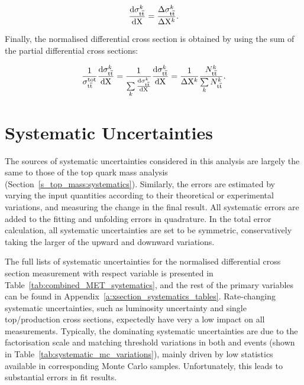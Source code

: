 \begin{equation}
\label{eq:differential_xsection}
\frac{\mathrm{d}\sigma_{\mathrm{t}\overline{\mathrm{t}}}^k}{\mathrm{d} \mathrm{X}} = \frac{\Delta\sigma_{\mathrm{t}\overline{\mathrm{t}}}^k}{\Delta \mathrm{X}^k }.
\end{equation}

Finally, the normalised differential cross section is obtained by using the sum of the partial differential cross
sections:

\begin{equation}
\label{eq:normalised_differential_xsection}
\frac{1}{\sigma_{\mathrm{t}\overline{\mathrm{t}}}^\mathrm{tot}} \frac{\mathrm{d}\sigma_{\mathrm{t}\overline{\mathrm{t}}}^k}{\mathrm{d} \mathrm{X}} =
\frac{1}{\sum\limits_k{\frac{\mathrm{d}\sigma_{\mathrm{t}\overline{\mathrm{t}}}^k}{\mathrm{d} \mathrm{X}}}} \frac{\mathrm{d}\sigma_{\mathrm{t}\overline{\mathrm{t}}}^k}{\mathrm{d}
\mathrm{X}} = \frac{1}{\Delta \mathrm{X}^k} \frac{N_{\mathrm{t}\overline{\mathrm{t}}}^k}{\sum\limits_k N_{\mathrm{t}\overline{\mathrm{t}}}^k}.
\end{equation}

\section{Systematic Uncertainties}
\label{s_xsection:systematics}
The sources of systematic uncertainties considered in this analysis are largely the same to those of the top quark mass
analysis (Section~\ref{s_top_mass:systematics}). Similarly, the errors are estimated by varying the input quantities
according to their theoretical or experimental variations, and measuring the change in the final result. All systematic
errors are added to the fitting and unfolding errors in quadrature. In the total error calculation, all systematic
uncertainties are set to be symmetric, conservatively taking the larger of the upward and downward variations.

The full lists of systematic uncertainties for the normalised differential cross section measurement with respect \MET
variable is presented in Table~\ref{tab:combined_MET_systematics}, and the rest of the primary variables can be found in
Appendix~\ref{a:xsection_systematics_tables}. Rate-changing systematic uncertainties, such as luminosity uncertainty and
single top/\ttbar production cross sections, expectedly have very a low impact on all measurements. Typically, the
dominating systematic uncertainties are due to the factorisation scale and matching threshold variations in both \VpJets
and \ttbar events (shown in Table~\ref{tab:systematic_mc_variations}), mainly driven by low statistics available in
corresponding Monte Carlo samples. Unfortunately, this leads to substantial errors in fit results.

